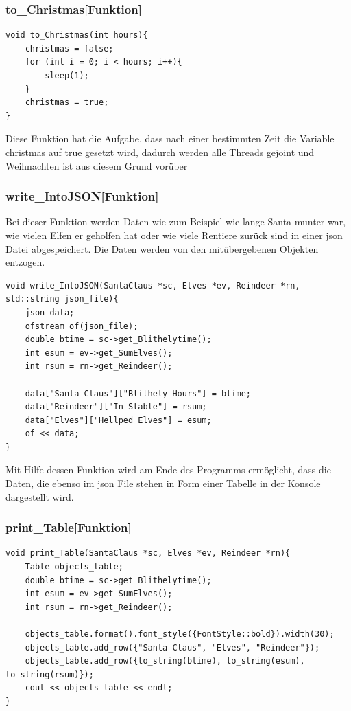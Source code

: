 \documentclass[a4paper,12pt]{article}
\begin{document}
\subsubsection{to\_Christmas[Funktion]}
\begin{verbatim}
void to_Christmas(int hours){
    christmas = false;
    for (int i = 0; i < hours; i++){
        sleep(1);
    }
    christmas = true;
}
\end{verbatim}
Diese Funktion hat die Aufgabe, dass nach einer bestimmten Zeit die Variable christmas auf true gesetzt wird, dadurch
werden alle Threads gejoint und Weihnachten ist aus diesem Grund vorüber
\newpage
\subsubsection{write\_IntoJSON[Funktion]}
Bei dieser Funktion werden Daten wie zum Beispiel wie lange Santa munter war, wie vielen Elfen er geholfen hat oder 
wie viele Rentiere zurück sind in einer json Datei abgespeichert. Die Daten werden von den mitübergebenen Objekten entzogen.
\begin{verbatim}
void write_IntoJSON(SantaClaus *sc, Elves *ev, Reindeer *rn, std::string json_file){
    json data;
    ofstream of(json_file);
    double btime = sc->get_Blithelytime();
    int esum = ev->get_SumElves();
    int rsum = rn->get_Reindeer();

    data["Santa Claus"]["Blithely Hours"] = btime;
    data["Reindeer"]["In Stable"] = rsum;
    data["Elves"]["Hellped Elves"] = esum;
    of << data;
}
\end{verbatim}
Mit Hilfe dessen Funktion wird am Ende des Programms ermöglicht, dass die Daten, die ebenso im json File stehen 
in Form einer Tabelle in der Konsole dargestellt wird.
\subsubsection{print\_Table[Funktion]}
\begin{verbatim}
void print_Table(SantaClaus *sc, Elves *ev, Reindeer *rn){
    Table objects_table;
    double btime = sc->get_Blithelytime();
    int esum = ev->get_SumElves();
    int rsum = rn->get_Reindeer();

    objects_table.format().font_style({FontStyle::bold}).width(30);
    objects_table.add_row({"Santa Claus", "Elves", "Reindeer"});
    objects_table.add_row({to_string(btime), to_string(esum), to_string(rsum)});
    cout << objects_table << endl;
}
\end{verbatim}
\end{document}
